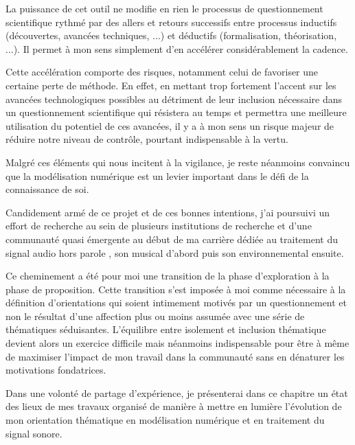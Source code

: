 La puissance de cet outil ne modifie en rien le processus de questionnement scientifique rythmé par des allers et retours successifs entre processus inductifs (découvertes, avancées techniques, ...) et déductifs (formalisation, théorisation, ...). Il permet à mon sens simplement d'en accélérer considérablement la cadence.

Cette accélération comporte des risques, notamment celui de favoriser une certaine perte de méthode. En effet, en mettant trop fortement l'accent sur les avancées technologiques possibles au détriment de leur inclusion nécessaire dans un questionnement scientifique qui résistera au temps et permettra une meilleure utilisation du potentiel de ces avancées, il y a à mon sens un risque majeur de réduire notre niveau de contrôle, pourtant indispensable à la vertu.

Malgré ces éléments qui nous incitent à la vigilance, je reste néanmoins convaincu que la modélisation numérique est un levier important dans le défi de la connaissance de soi.

Candidement armé de ce projet et de ces bonnes intentions, j'ai poursuivi un effort de recherche au sein de plusieurs institutions de recherche et d'une communauté quasi émergente au début de ma carrière dédiée au traitement du signal audio \og hors parole \fg, son musical d'abord puis son environnemental ensuite. %

Ce cheminement a été pour moi une transition de la phase d'exploration à la phase de proposition. Cette transition s'est imposée à moi comme nécessaire à la définition d'orientations qui soient intimement motivés par un questionnement et non le résultat d'une affection plus ou moins assumée avec une série de thématiques séduisantes. L'équilibre entre isolement et inclusion thématique devient alors un exercice difficile mais néanmoins indispensable pour être à même de maximiser l'impact de mon travail dans la communauté sans en dénaturer les motivations fondatrices.

Dans une volonté de partage d'expérience, je présenterai dans ce chapitre un état des lieux de mes travaux organisé de manière à mettre en lumière l'évolution de mon orientation thématique en modélisation numérique et en traitement du signal sonore.

